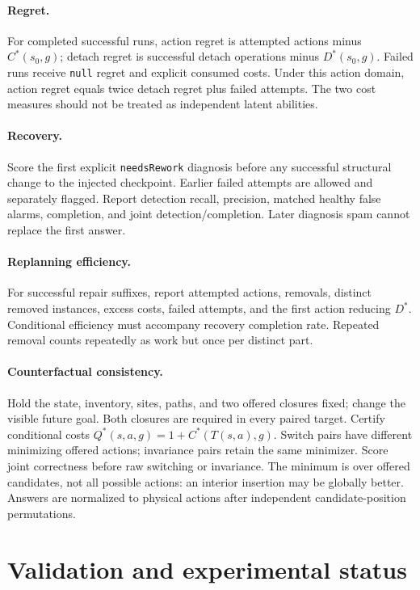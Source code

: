 \documentclass[10pt,twocolumn]{article}
\begin{document}
\paragraph{Regret.}
For completed successful runs, action regret is attempted actions minus
$C^*(s_0,g)$; detach regret is successful detach operations minus $D^*(s_0,g)$.
Failed runs receive \texttt{null} regret and explicit consumed costs. Under this
action domain, action regret equals twice detach regret plus failed attempts.
The two cost measures should not be treated as independent latent abilities.

\paragraph{Recovery.}
Score the first explicit \texttt{needsRework} diagnosis before any successful
structural change to the injected checkpoint. Earlier failed attempts are
allowed and separately flagged. Report detection recall, precision, matched
healthy false alarms, completion, and joint detection/completion. Later
diagnosis spam cannot replace the first answer.

\paragraph{Replanning efficiency.}
For successful repair suffixes, report attempted actions, removals, distinct
removed instances, excess costs, failed attempts, and the first action reducing
$D^*$. Conditional efficiency must accompany recovery completion rate.
Repeated removal counts repeatedly as work but once per distinct part.

\paragraph{Counterfactual consistency.}
Hold the state, inventory, sites, paths, and two offered closures fixed; change
the visible future goal. Both closures are required in every paired target.
Certify conditional costs $Q^*(s,a,g)=1+C^*(T(s,a),g)$.
Switch pairs have different minimizing offered actions; invariance pairs retain
the same minimizer. Score joint correctness before raw switching or invariance.
The minimum is over offered candidates, not all possible actions: an interior
insertion may be globally better. Answers are normalized to physical actions
after independent candidate-position permutations.

\section{Validation and experimental status}
\end{document}
